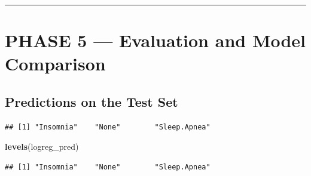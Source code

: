 \documentclass[
]{article}
\newenvironment{Shaded}{\begin{snugshade}}{\end{snugshade}}
\newcommand{\AttributeTok}[1]{\textcolor[rgb]{0.13,0.29,0.53}{#1}}
\newcommand{\CommentTok}[1]{\textcolor[rgb]{0.56,0.35,0.01}{\textit{#1}}}
\newcommand{\FunctionTok}[1]{\textcolor[rgb]{0.13,0.29,0.53}{\textbf{#1}}}
\newcommand{\NormalTok}[1]{#1}
\newcommand{\OtherTok}[1]{\textcolor[rgb]{0.56,0.35,0.01}{#1}}
\newcommand{\SpecialCharTok}[1]{\textcolor[rgb]{0.81,0.36,0.00}{\textbf{#1}}}
\begin{document}
\begin{center}\rule{0.5\linewidth}{0.5pt}\end{center}

\section{\texorpdfstring{\textbf{PHASE 5 --- Evaluation and Model
Comparison}}{PHASE 5 --- Evaluation and Model Comparison}}\label{phase-5-evaluation-and-model-comparison}

\subsection{Predictions on the Test
Set}\label{predictions-on-the-test-set}

\begin{Shaded}
\end{Shaded}

\begin{verbatim}
## [1] "Insomnia"    "None"        "Sleep.Apnea"
\end{verbatim}

\begin{Shaded}
\begin{Highlighting}[]
\FunctionTok{levels}\NormalTok{(logreg\_pred)}
\end{Highlighting}
\end{Shaded}

\begin{verbatim}
## [1] "Insomnia"    "None"        "Sleep.Apnea"
\end{verbatim}
\end{document}
